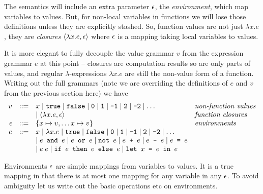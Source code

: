 The semantics will include an extra parameter $\epsilon$, the \emph{environment}, which map variables to values.  But, for non-local variables in functions we will lose those definitions unless they are explicitly stashed.  So, function values are not just $\lambda x.e$, they are \emph{closures} $\langle \lambda x.e, \epsilon \rangle$ where $\epsilon$ is a mapping taking local variables to values.

It is more elegant to fully decouple the value grammar $v$ from the expression grammar $e$ at this point -- closures are computation results so are only parts of values, and regular $\lambda$-expressions $\lambda x.e$ are still the non-value form of a function.  Writing out the full grammars (note we are overriding the definitions of $e$ and $v$ from the previous section here) we have
$$
\begin{array}{rcll}
v &::=& x \mid \texttt{true} \mid \texttt{false} \mid \texttt{0}\mid \texttt{1}\mid \texttt{-1}\mid \texttt{2}\mid  \texttt{-2}\mid \ldots & \textit{non-function values}\\
  &   & \mid \langle \lambda x. e, \epsilon \rangle  & \textit{function closures}\\
\epsilon &::=& \{x \mapsto v, \dots x \mapsto v \}&\textit{environments}\\
e &::=& x \mid \lambda x. e \mid \texttt{true} \mid \texttt{false} \mid \texttt{0}\mid \texttt{1}\mid \texttt{-1}\mid \texttt{2}\mid  \texttt{-2}\mid \ldots\\
  &   & \mid e \texttt{ and } e \mid e \texttt{ or } e \mid \texttt{not }
        e \mid e \texttt{ + }e \mid e \texttt{ - }e \mid e \texttt{ = }e \\
& & \mid e\;e
\mid \texttt{if }e\texttt{ then }e\texttt{ else }e
\mid \texttt{let } x \texttt{ = }e\texttt{ in }e
\end{array}
$$
 
Environments $\epsilon$ are simple mappings from variables to values.  It is a true mapping in that there is at most one mapping for any variable in any $\epsilon$.   To avoid ambiguity let us write out the basic operations etc on environments.


